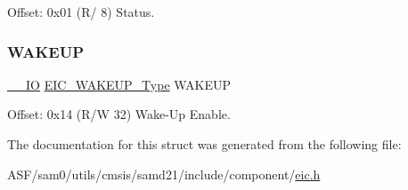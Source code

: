 Offset\+: 0x01 (R/ 8) Status. 

\mbox{\label{struct_eic_ac9247c83eaea1b7fcd50accc7ab23e71}} 
\subsubsection{\texorpdfstring{WAKEUP}{WAKEUP}}
{\footnotesize\ttfamily \mbox{\hyperlink{core__cm0plus_8h_aec43007d9998a0a0e01faede4133d6be}{\+\_\+\+\_\+\+IO}} \mbox{\hyperlink{union_e_i_c___w_a_k_e_u_p___type}{E\+I\+C\+\_\+\+W\+A\+K\+E\+U\+P\+\_\+\+Type}} W\+A\+K\+E\+UP}



Offset\+: 0x14 (R/W 32) Wake-\/\+Up Enable. 



The documentation for this struct was generated from the following file\+:\begin{DoxyCompactItemize}
\item 
A\+S\+F/sam0/utils/cmsis/samd21/include/component/\mbox{\hyperlink{component_2eic_8h}{eic.\+h}}\end{DoxyCompactItemize}
